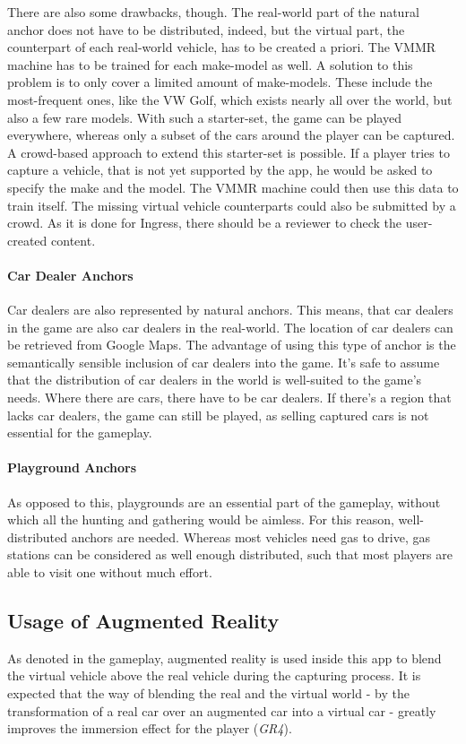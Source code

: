 There are also some drawbacks, though. The real-world part of the natural anchor does not have to be distributed, indeed, but the virtual part, the counterpart of each real-world vehicle, has to be created a priori. The VMMR machine has to be trained for each make-model as well. A solution to this problem is to only cover a limited amount of make-models. These include the most-frequent ones, like the VW Golf, which exists nearly all over the world, but also a few rare models. With such a starter-set, the game can be played everywhere, whereas only a subset of the cars around the player can be captured. A crowd-based approach to extend this starter-set is possible. If a player tries to capture a vehicle, that is not yet supported by the app, he would be asked to specify the make and the model. The VMMR machine could then use this data to train itself. The missing virtual vehicle counterparts could also be submitted by a crowd. As it is done for Ingress, there should be a reviewer to check the user-created content.

\paragraph{Car Dealer Anchors}
Car dealers are also represented by natural anchors. This means, that car dealers in the game are also car dealers in the real-world. The location of car dealers can be retrieved from Google Maps. The advantage of using this type of anchor is the semantically sensible inclusion of car dealers into the game. It's safe to assume that the distribution of car dealers in the world is well-suited to the game's needs. Where there are cars, there have to be car dealers. If there's a region that lacks car dealers, the game can still be played, as selling captured cars is not essential for the gameplay.

\paragraph{Playground Anchors}
As opposed to this, playgrounds are an essential part of the gameplay, without which all the hunting and gathering would be aimless. For this reason, well-distributed anchors are needed. Whereas most vehicles need gas to drive, gas stations can be considered as well enough distributed, such that most players are able to visit one without much effort.

\subsection{Usage of Augmented Reality}\label{sec:usageOfAR}
As denoted in the gameplay, augmented reality is used inside this app to blend the virtual vehicle above the real vehicle during the capturing process. It is expected that the way of blending the real and the virtual world - by the transformation of a real car over an augmented car into a virtual car - greatly improves the immersion effect for the player (\emph{GR4}).

